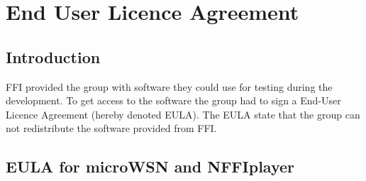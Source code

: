 \chapter{End User Licence Agreement}
\label{appendix-eula}

\section{Introduction}

FFI provided the group with software they could use for testing during the development. To get access to the software the group had to sign a End-User Licence Agreement (hereby denoted EULA). The EULA state that the group can not redistribute the software provided from FFI.

\section{EULA for microWSN and NFFIplayer}
